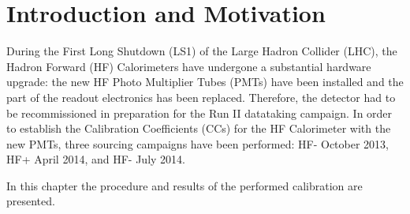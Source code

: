 \section{Introduction and Motivation}
During the First Long Shutdown (LS1) of the Large Hadron Collider (LHC), the Hadron Forward (HF) Calorimeters have undergone a substantial hardware upgrade: the
new HF Photo Multiplier Tubes (PMTs) have been installed and the part of the readout electronics has been replaced. Therefore, the detector had to be recommissioned in preparation for the Run II datataking campaign. In order to establish the Calibration Coefficients (CCs) for the HF Calorimeter with the new PMTs, three sourcing campaigns have been performed: HF- October 2013, HF+ April 2014, and HF- July 2014.

In this chapter the procedure and results of the performed calibration are presented.

